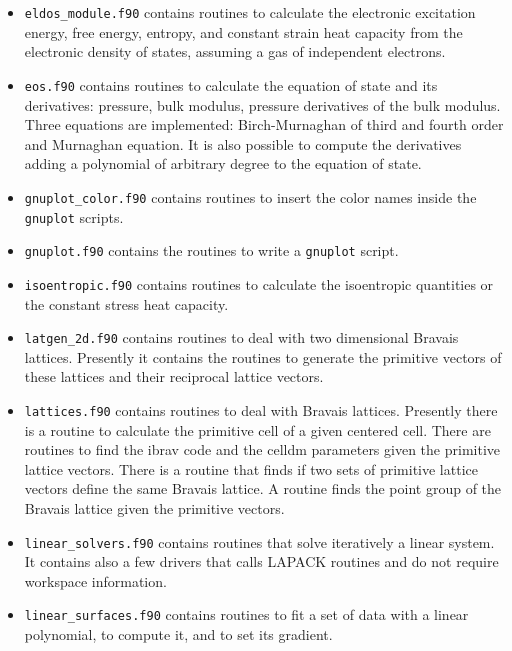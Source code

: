 \documentclass[12pt,a4paper,twoside]{report}
\begin{document}
\begin{itemize}
\item
\texttt{eldos\_module.f90} contains routines to calculate the electronic
excitation energy, free energy, entropy, and constant strain heat capacity
from the electronic density of states, assuming a gas of independent 
electrons.   

\item
\texttt{eos.f90} contains routines to calculate the equation of state and
its derivatives: pressure, bulk modulus, pressure derivatives of the bulk
modulus. Three equations are implemented: Birch-Murnaghan of third
and fourth order and Murnaghan equation. It is also possible to compute
the derivatives adding a polynomial of arbitrary degree to the equation
of state.

\item
\texttt{gnuplot\_color.f90} contains routines to insert the color names
inside the \texttt{gnuplot} scripts.

\item
\texttt{gnuplot.f90} contains the routines to write a \texttt{gnuplot} script.

\item
\texttt{isoentropic.f90} contains routines to calculate the isoentropic
quantities or the constant stress heat capacity.

\item
\texttt{latgen\_2d.f90} contains routines to deal with two dimensional
Bravais lattices. Presently it contains the routines to generate the
primitive vectors of these lattices and their reciprocal lattice vectors.

\item \texttt{lattices.f90} contains routines to deal with Bravais lattices.
Presently there is a routine to calculate the primitive cell of
a given centered cell. There are routines to find the ibrav code and the
celldm parameters given the primitive lattice vectors. There is a routine
that finds if two sets of primitive lattice vectors define the same 
Bravais lattice. A routine finds the point group of the Bravais lattice
given the primitive vectors.

\item
\texttt{linear\_solvers.f90} contains routines that solve iteratively
a linear system. It contains also a few drivers that calls LAPACK routines
and do not require workspace information. 

\item
\texttt{linear\_surfaces.f90} contains routines to fit a set of data
with a linear polynomial, to compute it, and to set its gradient.  


\end{itemize}
\end{document}
